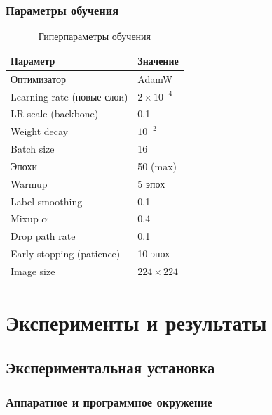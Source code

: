 \documentclass[14pt,a4paper]{extreport}
\begin{document}
\subsection{Параметры обучения}

\begin{table}[H]
\centering
\caption{Гиперпараметры обучения}
\label{tab:hyperparams}
\begin{tabular}{ll}
\toprule
Параметр & Значение \\
\midrule
Оптимизатор & AdamW \\
Learning rate (новые слои) & $2 \times 10^{-4}$ \\
LR scale (backbone) & 0.1 \\
Weight decay & $10^{-2}$ \\
Batch size & 16 \\
Эпохи & 50 (max) \\
Warmup & 5 эпох \\
Label smoothing & 0.1 \\
Mixup $\alpha$ & 0.4 \\
Drop path rate & 0.1 \\
Early stopping (patience) & 10 эпох \\
Image size & $224 \times 224$ \\
\bottomrule
\end{tabular}
\end{table}

\chapter{Эксперименты и результаты}
\label{ch:experiments}

\section{Экспериментальная установка}

\subsection{Аппаратное и программное окружение}
\end{document}
